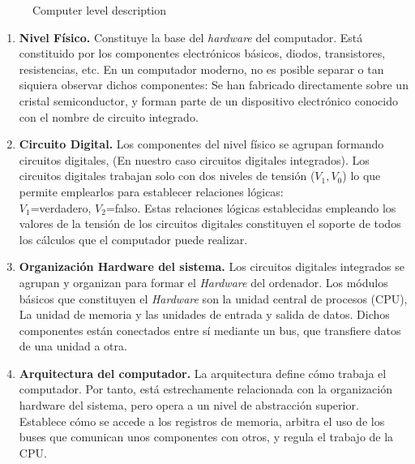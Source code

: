 \begin{paracol}{2}
\begin{figure}[ht]
	\renewcommand{\figurename}{Figure}
	\caption{Computer level description}
	\label{fig:nivele}
\end{figure}
\switchcolumn
\begin{enumerate}
\item \textbf{Nivel Físico.} Constituye la base del \emph{hardware} del computador. Está constituido por los componentes electrónicos básicos, diodos, transistores, resistencias, etc.  En un computador moderno, no es posible separar o tan siquiera observar dichos componentes: Se han fabricado directamente sobre un cristal semiconductor, y forman parte de un dispositivo electrónico conocido con el nombre de circuito integrado.

\item \textbf{Circuito Digital.}
Los componentes del nivel físico se agrupan formando circuitos digitales, (En nuestro caso circuitos digitales integrados). Los circuitos digitales trabajan solo con dos niveles de tensión ($V_1, V_0$) lo que permite emplearlos para establecer relaciones lógicas:\\ $V_1$=verdadero, $V_2$=falso. Estas relaciones lógicas establecidas empleando los valores de la tensión de los circuitos digitales constituyen el soporte de todos los cálculos que el computador puede realizar.

\item \textbf{Organización Hardware del sistema.} 
Los circuitos digitales integrados se agrupan y organizan para formar el \emph{Hardware} del ordenador.  Los módulos básicos que constituyen el \emph{Hardware} son la unidad central de procesos (CPU), La unidad de memoria y las unidades de entrada y salida de datos. Dichos componentes están conectados entre sí mediante un bus, que transfiere datos de una unidad a otra.

\item \textbf{Arquitectura del computador.} 
La arquitectura define cómo trabaja el computador. Por tanto, está estrechamente relacionada con la organización hardware del sistema, pero opera a un nivel de abstracción superior. Establece cómo se accede a los registros de memoria, arbitra el uso de los buses que comunican unos componentes con otros, y regula el trabajo de la CPU.  


\end{enumerate}
\end{paracol}
